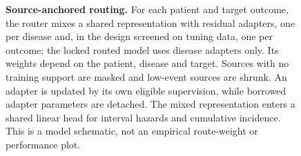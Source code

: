 


\begin{figure}[p]
  \centering
  \resizebox{0.96\textwidth}{!}{}
  \caption{\textbf{Source-anchored routing.} For each patient and target
  outcome, the router mixes a shared representation with residual adapters, one
  per disease and, in the design screened on tuning data, one per outcome; the
  locked routed model uses disease adapters only. Its weights depend on the
  patient, disease and target. Sources with no training support are masked and
  low-event sources are shrunk. An adapter is updated by its own eligible
  supervision, while borrowed adapter parameters are detached. The mixed
  representation enters a shared linear head for interval hazards and
  cumulative incidence. This is a model schematic, not an empirical route-weight
  or performance plot.}
  \label{fig:source-router}
\end{figure}


